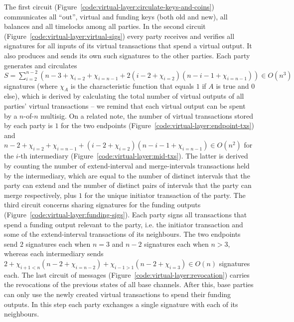   The first circuit (Figure~\ref{code:virtual-layer:circulate-keys-and-coins})
  communicates all ``out'', virtual and funding keys (both old and new), all
  balances and all timelocks among all parties. In the second circuit
  (Figure~\ref{code:virtual-layer:virtual-sigs}) every party receives and
  verifies all signatures for all inputs of its virtual transactions that spend
  a virtual output. It also produces and sends its own such signatures to the
  other parties. Each party generates and circulates $S = \sum\limits_{i =
  2}^{n-2} (n-3 + \chi_{i = 2} + \chi_{i = n - 1} + 2(i - 2 + \chi_{i = 2})(n -
  i - 1 + \chi_{i = n - 1})) \in O(n^3)$ signatures (where $\chi_A$ is the
  characteristic function that equals $1$ if $A$ is true and $0$ else), which is
  derived by calculating the total number of virtual outputs of all parties'
  virtual transactions -- we remind that each virtual output can be spent by a
  $n$-of-$n$ multisig.
On a related note, the
  number of virtual transactions stored by each party is $1$ for the two
  endpoints (Figure~\ref{code:virtual-layer:endpoint-txs}) and $n - 2 + \chi_{i
  = 2} + \chi_{i = n - 1} +  (i - 2 + \chi_{i = 2}) (n - i - 1 + \chi_{i = n-1})
  \in O(n^2)$ for the $i$-th intermediary
  (Figure~\ref{code:virtual-layer:mid-txs}). The latter is derived by counting
  the number of extend-interval and merge-intervals transactions held by the
  intermediary, which are equal to the number of distinct intervals that the
  party can extend and the number of distinct pairs of intervals that the party
  can merge respectively, plus $1$ for the unique initiator transaction of the
  party.
  The third circuit concerns sharing signatures for the funding outputs
  (Figure~\ref{code:virtual-layer:funding-sigs}). Each party signs all
  transactions that spend a funding output relevant to the party, i.e. the
  initiator transaction and some of the extend-interval transactions of its
  neighbours. The two endpoints send $2$ signatures each when $n = 3$ and $n -
  2$ signatures each when $n > 3$, whereas each intermediary sends $2 + \chi_{i
  + 1 < n}(n - 2 + \chi_{i = n - 2}) + \chi_{i - 1 > 1}(n - 2 + \chi_{i = 3})
  \in O(n)$ signatures each. The last circuit of messages
  (Figure~\ref{code:virtual-layer:revocation}) carries the revocations of the
  previous states of all base channels. After this, base parties can only use
  the newly created virtual transactions to spend their funding outputs. In this
  step each party exchanges a single signature with each of its neighbours.

